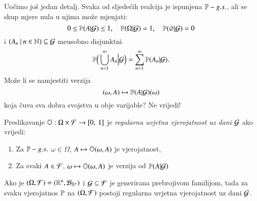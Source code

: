 Uo\v cimo jo\v s jedan detalj.
Svaka od sljede\' cih realcija je ispunjena $\mathbb{P}-g.s.$, ali se skup mjere nula u njima mo\v ze mjenjati:
\begin{equation}    \label{jed:22.25}
    0 \leq \mathbb{P} (A | \mathcal{G}) \leq 1, \quad \mathbb{P} (\Omega | \mathcal{G}) = 1, \quad \mathbb{P} (\varnothing | \mathcal{G}) = 0
\end{equation}
i $({A_n} \: | \: {n \in \mathbb{N}}) \subseteq \mathcal{G}$ me\dj usobno disjunktni
\begin{equation}    \label{jed:22.26}
    \mathbb{P} \Big( \bigcup\limits_{n = 1}^{\infty} A_n \Big| \mathcal{G} \Big) = \sum\limits_{n = 1}^{\infty} \mathbb{P} (A_n | \mathcal{G}).
\end{equation}
Mo\v ze li se namjestiti verzija
\begin{equation*}
    (\omega, A) \mapsto \mathbb{P} (A | \mathcal{G}) (\omega)
\end{equation*}
koja \v cuva sva dobra svojstva u obje varijable?
Ne vrijedi!

\begin{defn}    \label{defn:22.27}
    Preslikavanje $\mathbb{O} : \Omega \times \mathcal{F} \to [{0}, \:{1}]$ je \emph{regularna uvjetna vjerojatnost uz dani $\mathcal{G}$} ako vrijedi:
    \begin{enumerate}[label=(\alph*)]
        \item   \label{defn:22.27.1}
        Za $\mathbb{P}-g.s.$ $\omega \in \Omega$, $A \mapsto \mathbb{O} (\omega, A)$ je vjerojatnost,
        \item   \label{defn:22.27.2}
        Za svaki $A \in \mathcal{F}$, $\omega \mapsto \mathbb{O} (\omega, A)$ je verzija od $\mathbb{P} (A | \mathcal{G})$
    \end{enumerate}
\end{defn}

\begin{tm}  \label{tm:22.28}
    Ako je $(\Omega, \mathcal{F}) = (\mathbb{R}^n, \mathcal{B}_{\mathbb{R}^n})$ i $\mathcal{G} \subseteq \mathcal{F}$ je generirana prebrojivom familijom, tada za svaku vjerojatnos $\mathbb{P}$ na $(\Omega, \mathcal{F})$ postoji regularna uvjetna vjerojatnost uz dani $\mathcal{G}$.
\end{tm}